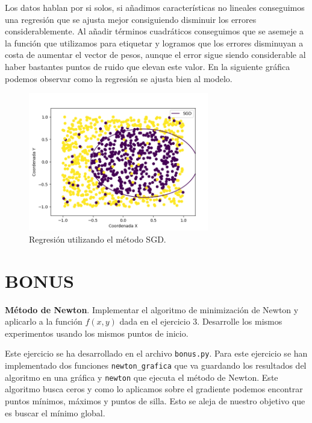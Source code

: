 \documentclass[size=a4, parskip=half, titlepage=false, toc=flat, toc=bib, 12pt]{scrartcl}
\begin{document}
\begin{enumerate}
\begin{itemize}
Los datos hablan por si solos, si añadimos características no lineales conseguimos una regresión
que se ajusta mejor consiguiendo disminuir los errores considerablemente. Al añadir términos cuadráticos
conseguimos que se asemeje a la función que utilizamos para etiquetar y logramos que los errores
disminuyan a costa de aumentar el vector de pesos, aunque el error sigue siendo considerable al haber
bastantes puntos de ruido que elevan este valor. En la siguiente gráfica podemos observar como
la regresión se ajusta bien al modelo.

\begin{figure}[H]
\centering
\includegraphics[width=0.7\textwidth]{./img/conclusion}
\caption{Regresión utilizando el método SGD.}
\end{figure}

\end{itemize}
\end{enumerate}

\section{BONUS}

\textbf{Método de Newton}. Implementar el algoritmo de minimización de Newton
y aplicarlo a la función $f (x, y)$ dada en el ejercicio 3. Desarrolle los mismos experimentos
usando los mismos puntos de inicio.

Este ejercicio se ha desarrollado en el archivo \verb|bonus.py|. Para este ejercicio se han
implementado dos funciones \verb|newton_grafica| que va guardando los resultados del algoritmo
en una gráfica y \verb|newton| que ejecuta el método de Newton. Este algoritmo busca ceros y como
lo aplicamos sobre el gradiente podemos encontrar puntos mínimos, máximos y puntos de silla. Esto
se aleja de nuestro objetivo que es buscar el mínimo global.
\end{document}
